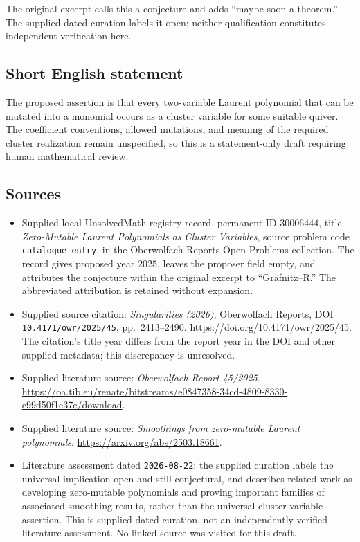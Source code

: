 \documentclass[11pt]{article}
\begin{document}
The original excerpt calls this a conjecture and adds ``maybe soon a theorem.'' The supplied dated curation labels it open; neither qualification constitutes independent verification here.
\subsection{Short English statement}
The proposed assertion is that every two-variable Laurent polynomial that can be mutated into a monomial occurs as a cluster variable for some suitable quiver. The coefficient conventions, allowed mutations, and meaning of the required cluster realization remain unspecified, so this is a statement-only draft requiring human mathematical review.
\subsection{Sources}
\begin{itemize}
\item Supplied local UnsolvedMath registry record, permanent ID \(30006444\), title \emph{Zero-Mutable Laurent Polynomials as Cluster Variables}, source problem code \texttt{catalogue entry}, in the Oberwolfach Reports Open Problems collection. The record gives proposed year \(2025\), leaves the proposer field empty, and attributes the conjecture within the original excerpt to ``Gr\"afnitz--R.'' The abbreviated attribution is retained without expansion.
\item Supplied source citation: \emph{Singularities (2026)}, Oberwolfach Reports, DOI \texttt{10.4171/owr/2025/45}, pp.~2413--2490. \url{https://doi.org/10.4171/owr/2025/45}. The citation's title year differs from the report year in the DOI and other supplied metadata; this discrepancy is unresolved.
\item Supplied literature source: \emph{Oberwolfach Report 45/2025}. \url{https://oa.tib.eu/renate/bitstreams/e0847358-34cd-4809-8330-e99d50f1e37e/download}.
\item Supplied literature source: \emph{Smoothings from zero-mutable Laurent polynomials}. \url{https://arxiv.org/abs/2503.18661}.
\item Literature assessment dated \texttt{2026-08-22}: the supplied curation labels the universal implication open and still conjectural, and describes related work as developing zero-mutable polynomials and proving important families of associated smoothing results, rather than the universal cluster-variable assertion. This is supplied dated curation, not an independently verified literature assessment. No linked source was visited for this draft.
\end{itemize}
\end{document}
